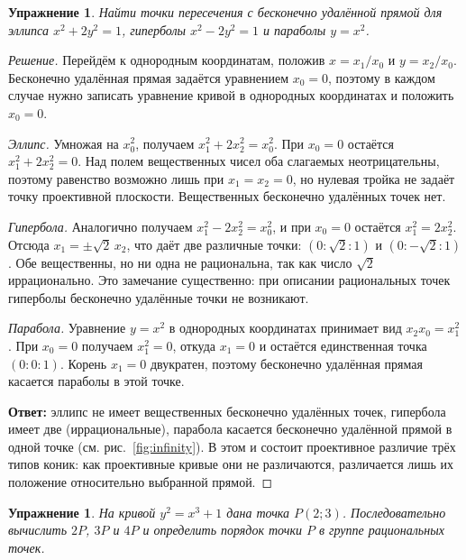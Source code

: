 \documentclass[a4paper,14pt]{extreport}
\theoremstyle{definition}
\newtheorem{exer}[thm]{Упражнение}
\newcommand{\answer}[1]{\par\medskip\noindent\textbf{Ответ:} #1}
\begin{document}
\begin{exer}\label{ex:infty}
\itshape Найти точки пересечения с бесконечно удалённой прямой для эллипса
$x^2+2y^2=1$, гиперболы $x^2-2y^2=1$ и параболы $y=x^2$.
\end{exer}

\begin{proof}[Решение]
\normalfont
Перейдём к однородным координатам, положив $x=x_1/x_0$ и $y=x_2/x_0$. Бесконечно
удалённая прямая задаётся уравнением $x_0=0$, поэтому в каждом случае нужно
записать уравнение кривой в однородных координатах и положить $x_0=0$.

\emph{Эллипс.} Умножая на $x_0^2$, получаем $x_1^2+2x_2^2=x_0^2$. При $x_0=0$
остаётся $x_1^2+2x_2^2=0$. Над полем вещественных чисел оба слагаемых
неотрицательны, поэтому равенство возможно лишь при $x_1=x_2=0$, но нулевая
тройка не задаёт точку проективной плоскости. Вещественных бесконечно удалённых
точек нет.

\emph{Гипербола.} Аналогично получаем $x_1^2-2x_2^2=x_0^2$, и при $x_0=0$
остаётся $x_1^2=2x_2^2$. Отсюда $x_1=\pm\sqrt2\,x_2$, что даёт две различные
точки: $(0:\sqrt2:1)$ и $(0:-\sqrt2:1)$. Обе вещественны, но ни одна не
рациональна, так как число $\sqrt2$ иррационально. Это замечание существенно:
при описании рациональных точек гиперболы бесконечно удалённые точки не
возникают.

\emph{Парабола.} Уравнение $y=x^2$ в однородных координатах принимает вид
$x_2x_0=x_1^2$. При $x_0=0$ получаем $x_1^2=0$, откуда $x_1=0$ и остаётся
единственная точка $(0:0:1)$. Корень $x_1=0$ двукратен, поэтому бесконечно
удалённая прямая касается параболы в этой точке.

\answer{эллипс не имеет вещественных бесконечно удалённых точек, гипербола имеет
две (иррациональные), парабола касается бесконечно удалённой прямой в одной
точке (см. рис.~\ref{fig:infinity}). В этом и состоит проективное различие трёх типов
коник: как проективные кривые они не различаются, различается лишь их положение
относительно выбранной прямой.}
\end{proof}

\begin{exer}\label{ex:cubic}
\itshape На кривой $y^2=x^3+1$ дана точка $P(2;3)$. Последовательно вычислить
$2P$, $3P$ и $4P$ и определить порядок точки $P$ в группе рациональных точек.
\end{exer}
\end{document}
